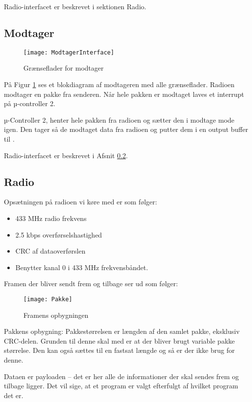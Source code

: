 \documentclass[Main]{subfiles}
\begin{document}
Radio-interfacet er beskrevet i sektionen Radio.



\subsection{Modtager}

\begin{figure}[H]
\centering
\texttt{[image: ModtagerInterface]}
\caption{Grænseflader for modtager}
\label{fig: ModtagerInterface}
\end{figure}
På Figur \ref{fig: ModtagerInterface} ses et blokdiagram af modtageren med alle grænseflader.
Radioen modtager en pakke fra senderen. Når hele pakken er modtaget laves et interrupt på µ-controller 2.

µ-Controller 2, henter hele pakken fra radioen og sætter den i modtage mode igen. 
Den tager så de modtaget data fra radioen og putter dem i en output buffer til \itoc.

Radio-interfacet er beskrevet i Afsnit \ref{Sec:Radio}.


\subsection{Radio} \label{Sec:Radio}
Opsætningen på radioen vi køre med er som følger:
\begin{itemize}
\item 433 MHz radio frekvens
\item 2.5 kbps overførselshastighed
\item CRC af dataoverførslen
\item Benytter kanal 0 i 433 MHz frekvensbåndet.
\end{itemize}


Framen der bliver sendt frem og tilbage ser ud som følger:
\begin{figure}[H]
\centering
\texttt{[image: Pakke]}
\caption{Framens opbygningen}
\label{fig: Pakke}
\end{figure}

Pakkens opbygning:
Pakkestørrelsen er længden af den samlet pakke, eksklusiv CRC-delen. 
Grunden til denne skal med er at der bliver brugt variable pakke størrelse. 
Den kan også sættes til en fastsat længde og så er der ikke brug for denne.

Dataen er payloaden -- det er her alle de informationer der skal sendes frem og tilbage ligger. 
Det vil sige, at et program er valgt efterfulgt af hvilket program det er.
\end{document}
